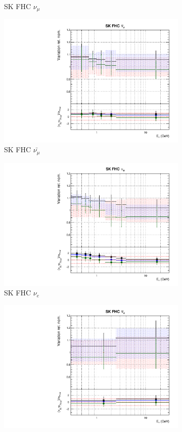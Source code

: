 \begin{figure}
\begin{subfigure}{0.45\textwidth}
  \caption{SK FHC $\nu_{\mu}$}
\end{subfigure}
\begin{subfigure}{0.45\textwidth}
  \centering
  \includegraphics[width=0.75\linewidth]{figs/fhcrhcfitsflux_9}
  \caption{SK FHC $\bar{\nu_{\mu}}$}
\end{subfigure}
\begin{subfigure}{0.45\textwidth}
  \centering
  \includegraphics[width=0.75\linewidth]{figs/fhcrhcfitsflux_10}
  \caption{SK FHC $\nu_e$}
\end{subfigure}
\begin{subfigure}{0.45\textwidth}
  \centering
  \includegraphics[width=0.75\linewidth]{figs/fhcrhcfitsflux_11}

\end{subfigure}
\end{figure}
